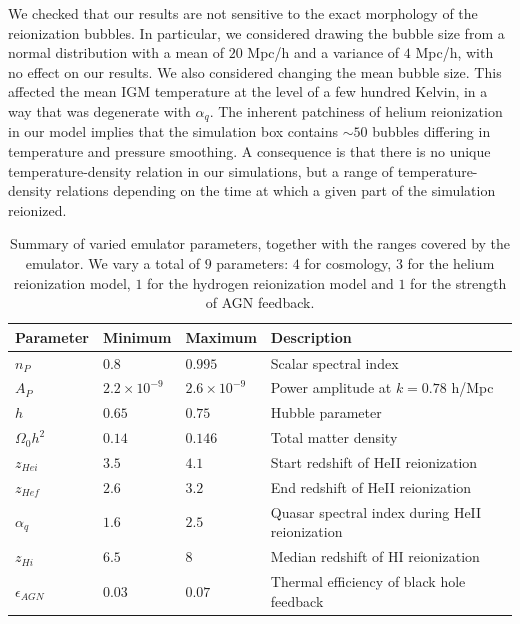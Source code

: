 \documentclass[a4paper,11pt]{article}
\begin{document}
We checked that our results are not sensitive to the exact morphology of the reionization bubbles. In particular, we considered drawing the bubble size from a normal distribution with a mean of $20$ Mpc/h and a variance of $4$ Mpc/h, with no effect on our results. We also considered changing the mean bubble size. This affected the mean IGM temperature at the level of a few hundred Kelvin, in a way that was degenerate with $\alpha_q$.
The inherent patchiness of helium reionization in our model implies that the simulation box contains $\sim 50$ bubbles differing in temperature and pressure smoothing. A consequence is that there is no unique temperature-density relation in our simulations, but a range of temperature-density relations depending on the time at which a given part of the simulation reionized.

\begin{table}
\begin{centering}
  \begin{tabular}{llll}
  \hline
  Parameter & Minimum & Maximum & Description \\
    \hline
    $n_P$  &  $0.8$  & $0.995$ & Scalar spectral index \\
    $A_P$  &  $2.2 \times 10^{-9}$  & $2.6 \times 10^{-9}$ & Power amplitude at $k = 0.78$ h/Mpc \\
    $h$    & $0.65$  & $0.75$ & Hubble parameter \\
    $\Omega_0 h^2$ & $0.14$ & $0.146$ & Total matter density \\
    $z_{Hei}$      & $3.5$  & $4.1$  & Start redshift of HeII reionization \\
    $z_{Hef}$      & $2.6$  & $3.2$  & End redshift of HeII reionization \\
    $\alpha_q$     & $1.6$  & $2.5$ & Quasar spectral index during HeII reionization  \\
    $z_{Hi}$        & $6.5$ & $8$   & Median redshift of HI reionization \\
    $\epsilon_{AGN}$ & $0.03$ & $0.07$ & Thermal efficiency of black hole feedback \\
    \hline
  \end{tabular}
  \caption{Summary of varied emulator parameters, together with the ranges covered by the emulator. We vary a total of $9$ parameters: $4$ for cosmology, $3$ for the helium reionization model, $1$ for the hydrogen reionization model and $1$ for the strength of AGN feedback.}
  \label{tab:emulatorparams}
  \end{centering}
\end{table}
\end{document}
